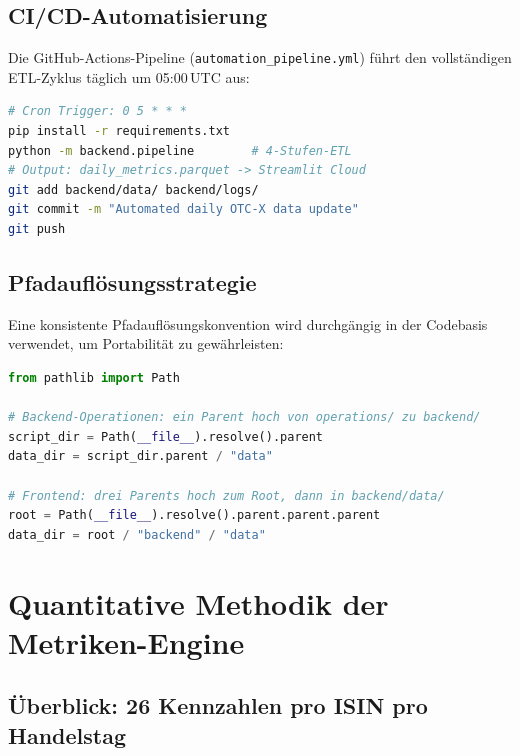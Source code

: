 \documentclass[12pt, a4paper, oneside]{report}
\newcommand{\code}[1]{\texttt{\small\textcolor{darknavy}{#1}}}
\begin{document}
\section{CI/CD-Automatisierung}

Die GitHub-Actions-Pipeline (\code{automation\_pipeline.yml}) f\"uhrt den vollst\"andigen ETL-Zyklus t\"aglich um 05:00\,UTC aus:

\begin{lstlisting}[language=bash, caption={CI/CD-Workflow\;---\;Vereinfachter Ablauf}]
# Cron Trigger: 0 5 * * *
pip install -r requirements.txt
python -m backend.pipeline        # 4-Stufen-ETL
# Output: daily_metrics.parquet -> Streamlit Cloud
git add backend/data/ backend/logs/
git commit -m "Automated daily OTC-X data update"
git push
\end{lstlisting}

\section{Pfadaufl\"osungsstrategie}

Eine konsistente Pfadaufl\"osungskonvention wird durchg\"angig in der Codebasis verwendet, um Portabilit\"at zu gew\"ahrleisten:

\begin{lstlisting}[language=Python, caption={Pfadaufl\"osung\;---\;keine hartkodierten Pfade}]
from pathlib import Path

# Backend-Operationen: ein Parent hoch von operations/ zu backend/
script_dir = Path(__file__).resolve().parent
data_dir = script_dir.parent / "data"

# Frontend: drei Parents hoch zum Root, dann in backend/data/
root = Path(__file__).resolve().parent.parent.parent
data_dir = root / "backend" / "data"
\end{lstlisting}


\chapter{Quantitative Methodik der Metriken-Engine}
\label{ch:metrics}

\section{\"Uberblick: 26 Kennzahlen pro ISIN pro Handelstag}
\end{document}
